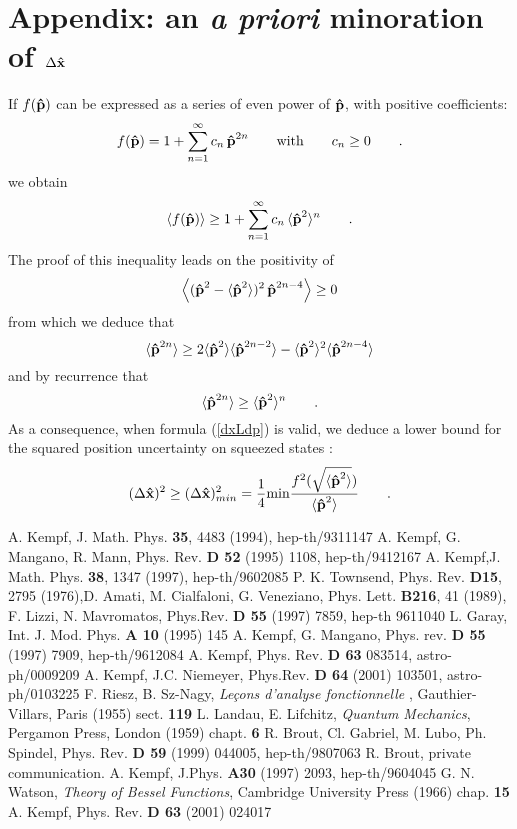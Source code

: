 \documentclass[a4paper,10pt]{article}
\newcommand{\x}{\mbox{\rm{\bf \^ x}}}
\newcommand{\p}{\mbox{\rm{\bf \^ p}}}
\begin{document}
\section{Appendix: an {\it a priori} minoration of $\Delta\x$} If
$f(\p)$ can be expressed as a series of even power of $\p$, with
positive coefficients:
\begin{equation} f(\p)=1+\sum_{n=1}^\infty c_n\,\p^{2n}\qquad {\rm
with}\qquad c_n\geq0\qquad.
\end{equation} we obtain
\begin{equation}
\langle f(\p)\rangle\geq 1+\sum_{n=1}^\infty
c_n\,\langle\p^2\rangle^n \qquad.
\end{equation} The proof of this inequality leads on the positivity of
\begin{equation}
\left\langle(\p^2-\langle\p^2\rangle)^2\,\p^{2n-4}\right\rangle\geq
0
\end{equation} from which we deduce that
\begin{equation}
\langle\p^{2n}\rangle\geq
2\langle\p^2\rangle\langle\p^{2n-2}\rangle -
\langle\p^2\rangle^2\langle\p^{2n-4}\rangle
\end{equation} and by recurrence that
\begin{equation}
\langle\p^{2n}\rangle \geq \langle\p^2\rangle^n\qquad.
\end{equation} As a consequence, when formula (\ref{dxLdp}) is valid,
we deduce a lower bound for the squared position uncertainty on
squeezed states :
\begin{equation} (\Delta\x)^2\geq(\Delta\x)^2_{min}=\frac 14 {\rm
min}\frac{f^2(\sqrt{\langle\p^2\rangle})}{\langle\p^2\rangle}\qquad
.\label{fsp}
\end{equation} \begin{thebibliography}{00}
 A. Kempf, J. Math. Phys. {\bf 35}, 4483 (1994), hep-th/9311147
 A. Kempf, G. Mangano, R. Mann, Phys. Rev. {\bf D 52}
(1995) 1108, hep-th/9412167
 A. Kempf,J. Math. Phys. {\bf 38}, 1347 (1997), hep-th/9602085
 P. K. Townsend, Phys. Rev. {\bf D15},
2795 (1976),D. Amati, M. Cialfaloni, G. Veneziano, Phys. Lett.
{\bf B216}, 41 (1989), F. Lizzi, N. Mavromatos, Phys.Rev. {\bf D
55} (1997) 7859, hep-th 9611040
 L. Garay, Int. J. Mod. Phys. {\bf A 10} (1995) 145
 A. Kempf, G. Mangano, Phys. rev. {\bf D 55} (1997) 7909,
hep-th/9612084
 A. Kempf, Phys. Rev. {\bf D 63} 083514,
astro-ph/0009209
 A. Kempf, J.C. Niemeyer, Phys.Rev. {\bf D 64} (2001)
103501, astro-ph/0103225
F. Riesz, B. Sz-Nagy, {\it Le\c{c}ons d'analyse
fonctionnelle} , Gauthier-Villars, Paris (1955) sect. {\bf 119}
L. Landau, E. Lifchitz, {\it Quantum Mechanics}, Pergamon
Press, London (1959) chapt. {\bf 6}
 R. Brout, Cl. Gabriel, M. Lubo, Ph. Spindel, Phys.
Rev. {\bf D 59} (1999) 044005, hep-th/9807063
 R. Brout, private communication.
 A. Kempf, J.Phys. {\bf A30} (1997) 2093,
hep-th/9604045
G. N. Watson, {\it Theory of Bessel Functions}, Cambridge
University Press (1966) chap. {\bf 15}
 A. Kempf, Phys. Rev. {\bf D 63} (2001) 024017
\end{thebibliography}
\end{document}

